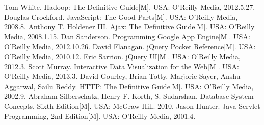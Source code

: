 \begin{thebibliography}{8}
  Tom White. Hadoop: The Definitive Guide[M]. USA: O'Reilly Media, 2012.5.27.
 Douglas Crockford. JavaScript: The Good Parts[M]. USA: O'Reilly Media, 2008.8.
 Anthony T. Holdener III. Ajax: The Definitive Guide[M]. USA: O'Reilly Media, 2008.1.15.
 Dan Sanderson. Programming Google App Engine[M]. USA: O'Reilly Media, 2012.10.26.
 David Flanagan. jQuery Pocket Reference[M]. USA: O'Reilly Media, 2010.12.
 Eric Sarrion. jQuery UI[M]. USA: O'Reilly Media, 2012.3.
 Scott Murray. Interactive Data Visualization for the Web[M].  USA: O’Reilly Media, 2013.3.
 David Gourley, Brian Totty, Marjorie Sayer, Anshu Aggarwal, Sailu Reddy. HTTP: The Definitive Guide[M]. USA: O'Reilly Media, 2002.9.
 Abraham Silberschatz, Henry F. Korth, S. Sudarshan. Database System Concepts, Sixth Edition[M]. USA: McGraw-Hill. 2010.
 Jason Hunter. Java Servlet Programming, 2nd Edition[M]. USA: O'Reilly Media, 2001.4.
\end{thebibliography}

